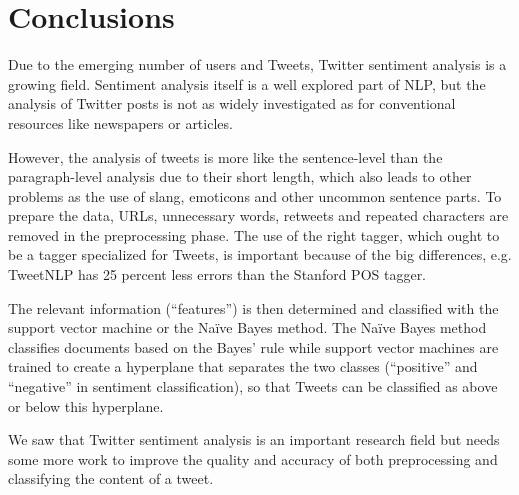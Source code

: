 \section{Conclusions}
Due to the emerging number of users and Tweets, Twitter sentiment analysis is a growing field. Sentiment analysis itself is a well explored part of NLP, but the analysis of Twitter posts is not as widely investigated as for conventional resources like newspapers or articles. 

However, the analysis of tweets is more like the sentence-level than the paragraph-level analysis due to their short length, which also leads to other problems as the use of slang, emoticons and other uncommon sentence parts. To prepare the data, URLs, unnecessary words, retweets and repeated characters are removed in the preprocessing phase. The use of the right tagger, which ought to be a tagger specialized for Tweets, is important because of the big differences, e.g. TweetNLP has 25 percent less errors than the Stanford POS tagger. 

The relevant information (``features'') is then determined and classified with the support vector machine or the Na\"ive Bayes method. The Na\"ive Bayes method classifies documents based on the Bayes' rule while support vector machines are trained to create a hyperplane that separates the two classes (``positive'' and ``negative'' in sentiment classification), so that Tweets can be classified as above or below this hyperplane.

We saw that Twitter sentiment analysis is an important research field but needs some more work to improve the quality and accuracy of both preprocessing and classifying the content of a tweet.
